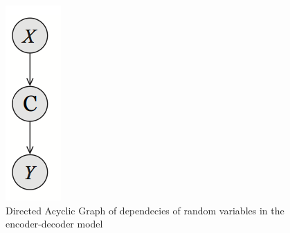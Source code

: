 \documentclass[preprint, 12pt]{elsarticle}
\begin{document}
		\begin{figure}[h]
			\centering
			\includegraphics[scale=0.4]{Imgs/BNI.png}
			\caption{Directed Acyclic Graph of dependecies of random variables in the encoder-decoder model}
			\label{fig:BNI}
		\end{figure}
		
\end{document}
